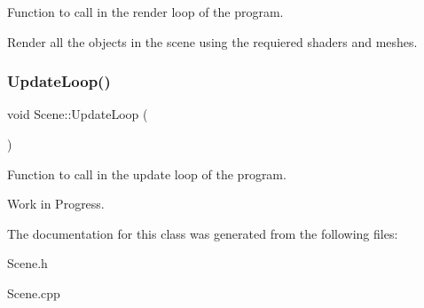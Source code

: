 Function to call in the render loop of the program. 

Render all the objects in the scene using the requiered shaders and meshes. \mbox{\label{class_scene_ab0293e9c900f18ce4ca26621d4b7ddfe}} 
\subsubsection{\texorpdfstring{Update\+Loop()}{UpdateLoop()}}
{\footnotesize\ttfamily void Scene\+::\+Update\+Loop (\begin{DoxyParamCaption}{ }\end{DoxyParamCaption})}



Function to call in the update loop of the program. 

Work in Progress. 

The documentation for this class was generated from the following files\+:\begin{DoxyCompactItemize}
\item 
Scene.\+h\item 
Scene.\+cpp\end{DoxyCompactItemize}
